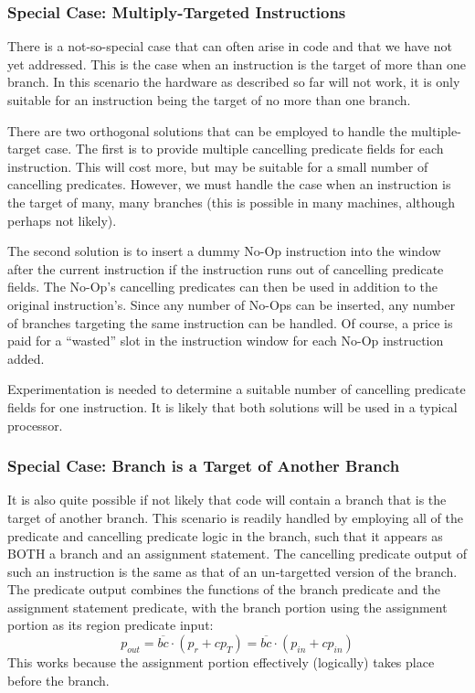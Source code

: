 \documentclass[10pt,dvips]{article}
\begin{document}
\subsubsection{Special Case: Multiply-Targeted Instructions}
There is a not-so-special case that can often arise in code and that we have not
yet addressed. This is the case when an instruction is the target of more than
one branch. In this scenario the hardware as described so far will not work, it
is only suitable for an instruction being the target of no more than one branch.

There are two orthogonal solutions that can be employed to handle the
multiple-target case. The first is to provide multiple cancelling predicate fields
for each instruction. This will cost more, but may be suitable for a small number
of cancelling predicates. However, we must handle the case when an instruction
is the target of many, many branches (this is possible in many machines, although
perhaps not likely).

The second solution is to insert a dummy No-Op instruction into the window after the
current instruction if the instruction runs out of cancelling predicate fields.
The No-Op's cancelling predicates can then be used in addition to the original
instruction's. Since any number of No-Ops can be
inserted, any number of branches targeting the same instruction can be
handled. Of course, a price is paid for a ``wasted'' slot in the instruction
window for each No-Op instruction added.

Experimentation is needed to determine a suitable number of cancelling
predicate fields for one instruction. It is likely that both solutions will
be used in a typical processor.

\subsubsection{Special Case: Branch is a Target of Another Branch}
It is also quite possible if not likely that code will contain a branch that
is the target of another branch. This scenario is readily handled by employing
all of the predicate and cancelling predicate logic in the branch, such that it
appears as BOTH a branch and an assignment statement. The cancelling predicate
output of such an instruction is the same as that of an un-targetted
version of the branch. The
predicate output combines the functions of the branch predicate and the
assignment statement predicate, with the branch portion using
the assignment portion as its region predicate input:
\[p_{out} = \overline{bc} \cdot (p_r + cp_T) = \overline{bc} \cdot (p_{in} + cp_{in}) \]
This works because the assignment portion effectively (logically) takes place
before the branch.
\end{document}
